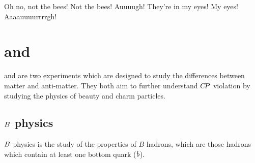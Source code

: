 \begin{savequote}[8cm]
Oh no, not the bees! Not the bees! Auuuugh! They're in my eyes! My eyes! Aaaauuuurrrrgh!
\end{savequote}

\chapter{\lhcb and \belletwo}\label{ch:1-intro}

\minitoc

\lhcb and \belletwo are two experiments which are designed to study the differences
between matter and anti-matter. They both aim to further understand ${C\!P}$ violation by
studying the physics of beauty and charm particles.

\section{${B}$ physics}\label{sec:1-bphysics}
${B}$ physics is the study of the properties of $B$ hadrons, which are those hadrons which contain at least
one bottom quark (${b}$).
